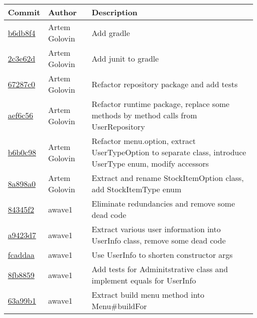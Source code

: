 \begin{tabularx}{\textwidth}{l l X}\textbf{Commit} & \textbf{Author} & \textbf{Description}\\ \hline
\href{https://github.com/awave1/assessment-loan-system/commit/b6db8f46362b69749f0ab51aa74c21bfd5c0735a}{b6db8f4} & Artem Golovin & Add gradle\\ \hline
\href{https://github.com/awave1/assessment-loan-system/commit/2c3e62d1230df91dce3ae401eacf0675cc67b6da}{2c3e62d} & Artem Golovin & Add junit to gradle\\ \hline
\href{https://github.com/awave1/assessment-loan-system/commit/67287c032e1134f22c6814f7fc4444dedbe694ff}{67287c0} & Artem Golovin & Refactor repository package and add tests\\ \hline
\href{https://github.com/awave1/assessment-loan-system/commit/aef6c56b44100119cbf74f7b0781316c9ec98bd0}{aef6c56} & Artem Golovin & Refactor runtime package, replace some methods by method calls from UserRepository\\ \hline
\href{https://github.com/awave1/assessment-loan-system/commit/b6b0c982f35695c9f9bb0eea222788ba911f6f26}{b6b0c98} & Artem Golovin & Refactor menu.option, extract UserTypeOption to separate class, introduce UserType enum, modify accessors\\ \hline
\href{https://github.com/awave1/assessment-loan-system/commit/8a898a0ca9406ffb32fb65c40485973b1f50e97a}{8a898a0} & Artem Golovin & Extract and rename StockItemOption class, add StockItemType enum\\ \hline
\href{https://github.com/awave1/assessment-loan-system/commit/84345f2013f6befd05186da0599a2787aa693b5a}{84345f2} & awave1 & Eliminate redundancies and remove some dead code\\ \hline
\href{https://github.com/awave1/assessment-loan-system/commit/a9423d7bc8b4dfe8d692af76560d1a34878f985c}{a9423d7} & awave1 & Extract various user information into UserInfo class, remove some dead code\\ \hline
\href{https://github.com/awave1/assessment-loan-system/commit/fcaddaa808bff70b463e9c852aa1653040a01ab8}{fcaddaa} & awave1 & Use UserInfo to shorten constructor args\\ \hline
\href{https://github.com/awave1/assessment-loan-system/commit/8fb88595a52dbac288d6425c3187bca65bd16a88}{8fb8859} & awave1 & Add tests for Adminitstrative class and implement equals for UserInfo\\ \hline
\href{https://github.com/awave1/assessment-loan-system/commit/63a99b1b447cdd0381bb1db428e05bcdcd7859ad}{63a99b1} & awave1 & Extract build menu method into Menu\#buildFor\\ \hline

\end{tabularx}
